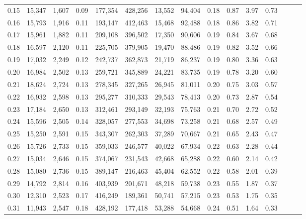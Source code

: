 \begin{tabular}{rrrrrrrrrrrrrrr}
0.15 &  15,347 &  1,607 &  0.09 &  177,354 &  428,256 &   13,552 &   94,404 &  0.18 &  0.87 &  3.97 &      0.73 \\
0.16 &  15,793 &  1,916 &  0.11 &  193,147 &  412,463 &   15,468 &   92,488 &  0.18 &  0.86 &  3.82 &      0.71 \\
0.17 &  15,961 &  1,882 &  0.11 &  209,108 &  396,502 &   17,350 &   90,606 &  0.19 &  0.84 &  3.67 &      0.68 \\
0.18 &  16,597 &  2,120 &  0.11 &  225,705 &  379,905 &   19,470 &   88,486 &  0.19 &  0.82 &  3.52 &      0.66 \\
0.19 &  17,032 &  2,249 &  0.12 &  242,737 &  362,873 &   21,719 &   86,237 &  0.19 &  0.80 &  3.36 &      0.63 \\
0.20 &  16,984 &  2,502 &  0.13 &  259,721 &  345,889 &   24,221 &   83,735 &  0.19 &  0.78 &  3.20 &      0.60 \\
0.21 &  18,624 &  2,724 &  0.13 &  278,345 &  327,265 &   26,945 &   81,011 &  0.20 &  0.75 &  3.03 &      0.57 \\
0.22 &  16,932 &  2,598 &  0.13 &  295,277 &  310,333 &   29,543 &   78,413 &  0.20 &  0.73 &  2.87 &      0.54 \\
0.23 &  17,184 &  2,650 &  0.13 &  312,461 &  293,149 &   32,193 &   75,763 &  0.21 &  0.70 &  2.72 &      0.52 \\
0.24 &  15,596 &  2,505 &  0.14 &  328,057 &  277,553 &   34,698 &   73,258 &  0.21 &  0.68 &  2.57 &      0.49 \\
0.25 &  15,250 &  2,591 &  0.15 &  343,307 &  262,303 &   37,289 &   70,667 &  0.21 &  0.65 &  2.43 &      0.47 \\
0.26 &  15,726 &  2,733 &  0.15 &  359,033 &  246,577 &   40,022 &   67,934 &  0.22 &  0.63 &  2.28 &      0.44 \\
0.27 &  15,034 &  2,646 &  0.15 &  374,067 &  231,543 &   42,668 &   65,288 &  0.22 &  0.60 &  2.14 &      0.42 \\
0.28 &  15,080 &  2,736 &  0.15 &  389,147 &  216,463 &   45,404 &   62,552 &  0.22 &  0.58 &  2.01 &      0.39 \\
0.29 &  14,792 &  2,814 &  0.16 &  403,939 &  201,671 &   48,218 &   59,738 &  0.23 &  0.55 &  1.87 &      0.37 \\
0.30 &  12,310 &  2,523 &  0.17 &  416,249 &  189,361 &   50,741 &   57,215 &  0.23 &  0.53 &  1.75 &      0.35 \\
0.31 &  11,943 &  2,547 &  0.18 &  428,192 &  177,418 &   53,288 &   54,668 &  0.24 &  0.51 &  1.64 &      0.33 \\

\end{tabular}
